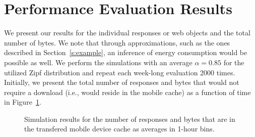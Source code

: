\documentclass[letterpaper,conference]{IEEEtran}
\begin{document}
\section{Performance Evaluation Results}
\label{s:results}
We present our results for the individual responses or web objects and the total number of bytes.
We note that through approximations, such as the ones described in Section~\ref{s:example}, an inference of energy consumption would be possible as well.
We perform the simulations with an average $\alpha=0.85$ for the utilized Zipf distribution and repeat each week-long evaluation 2000 times.
Initially, we present the total number of responses and bytes that would not require a download (i.e., would reside in the mobile cache) as a function of time in Figure~\ref{fig:sim1}.
\begin{figure}[h!]
	\centering
	\qquad
	\caption{Simulation results for the number of responses and bytes that are in the transfered mobile device cache as averages in 1-hour bins.}
	\label{fig:sim1}
\end{figure}
\end{document}
